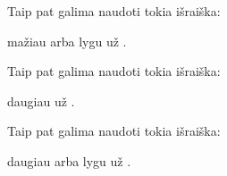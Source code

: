 \documentclass[letterpaper,10pt,lithuanian]{sphinxmanual}
\begin{document}
\begin{fulllineitems}
\label{\detokenize{formules:le}}
\pysigstartsignatures
\pysiglinewithargsret
{}
{\sphinxparamcomma {}}
{}
\pysigstopsignatures
\sphinxAtStartPar
Taip pat galima naudoti tokia išraiška:

\begin{sphinxVerbatim}[commandchars=\\\{\}]
  
\end{sphinxVerbatim}

\sphinxAtStartPar
{} mažiau arba lygu už .

\end{fulllineitems}


\begin{fulllineitems}
\label{\detokenize{formules:gt}}
\pysigstartsignatures
\pysiglinewithargsret
{}
{\sphinxparamcomma {}}
{}
\pysigstopsignatures
\sphinxAtStartPar
Taip pat galima naudoti tokia išraiška:

\begin{sphinxVerbatim}[commandchars=\\\{\}]
  
\end{sphinxVerbatim}

\sphinxAtStartPar
{} daugiau už .

\end{fulllineitems}


\begin{fulllineitems}
\label{\detokenize{formules:ge}}
\pysigstartsignatures
\pysiglinewithargsret
{}
{\sphinxparamcomma {}}
{}
\pysigstopsignatures
\sphinxAtStartPar
Taip pat galima naudoti tokia išraiška:

\begin{sphinxVerbatim}[commandchars=\\\{\}]
  
\end{sphinxVerbatim}

\sphinxAtStartPar
{} daugiau arba lygu už .

\end{fulllineitems}
\end{document}
